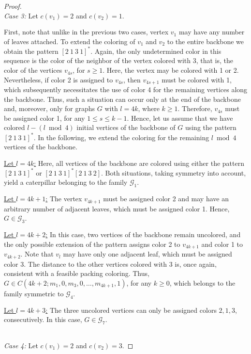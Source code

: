 \documentclass{article}
\begin{document}
\begin{proof}
~~\\
\emph{Case 3:} Let $c(v_1)=2$ and  $c(v_2)=1$. 

First, note that unlike in the previous two cases, vertex $v_1$ may have any number of leaves attached. To extend the coloring of $v_1$ and $v_2$ to the entire backbone we obtain the pattern $[2\ 1\ 3\ 1]^*$. Again, the only undetermined color in this sequence is the color of the neighbor of the vertex colored with 3, that is, the color of the vertices $v_{4s}$, for $s\geq 1$. Here, the vertex may be colored with 1 or 2. Nevertheless, if color 2 is assigned to $v_{4s}$, then $v_{4s+1}$ must be colored with 1, which subsequently necessitates the use of color 4 for the remaining vertices along the backbone. Thus, such a situation can occur only at the end of the backbone and, moreover, only for graphs $G$ with $l=4k$, where $k\geq 1$. Therefore, $v_{4s}$ must be assigned color 1, for any $ 1 \leq s\leq k -1$.
Hence, let us assume that we have colored $l - (l \bmod 4)$ initial vertices of the backbone of $G$ using the pattern $[2\ 1\ 3\ 1]^*$. In the following, we extend the coloring for the remaining $l \bmod 4$ vertices of the backbone.

\underline{Let $l=4k$:} Here, all vertices of the backbone are colored using either the pattern $[2\ 1\ 3\ 1]^*$ or $[2\ 1\ 3\ 1]^*[2\ 1\ 3\ 2]$. Both situations, taking symmetry into account, yield a caterpillar belonging to the family $\mathcal{G}_{1}$.

\underline{Let $l=4k+1$:} The vertex $v_{4k+1}$ must be assigned color 2 and may have an arbitrary number of adjacent leaves, which must be assigned color 1. Hence, $G\in \mathcal{G}_3$.

\underline{Let $l=4k+2$:} In this case, two vertices of the backbone remain uncolored, and the only possible extension of the pattern assigns color 2 to $v_{4k+1}$ and color 1 to $v_{4k+2}$. Note that $v_l$ may have only one adjacent leaf, which must be assigned color 3. The distance to the other vertices colored with 3 is, once again, consistent with a feasible packing coloring. Thus, $G \in C(4k+2; m_1, 0, m_3, 0, \ldots, m_{4k+1}, 1)$, for any $k\geq 0$, which belongs to the family symmetric to $\mathcal{G}_4$. 

\underline{Let $l=4k+3$:} The three uncolored vertices can only be assigned colors $2, 1, 3$, consecutively. In this case, $G\in \mathcal{G}_7$.

~~\\
\emph{Case 4:} Let $c(v_1)=2$ and $c(v_2)=3$. 


\end{proof}
\end{document}
